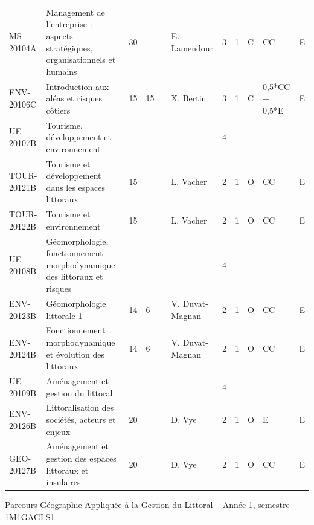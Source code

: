 \documentclass[a4paper,11pt]{article}
\begin{document}
{{\begin{tabular}{lllllllllll}
MS-20104A     & Management de l'entreprise : aspects stratégiques, organisationnels et humains & 30 &    &    & E. Lamendour    & 3    & 1    & C           & CC             & E           \\
ENV-20106C    & Introduction aux aléas et risques côtiers                                      & 15 & 15 &    & X. Bertin       & 3    & 1    & C           & 0,5*CC + 0,5*E & E           \\
\rowcolor[HTML]{C0C0C0} 
UE-20107B     & Tourisme, développement et environnement                                       &    &    &    &                 & 4    &      &             &                &             \\
TOUR-20121B   & Tourisme et développement dans les espaces littoraux                           & 15 &    &    & L. Vacher       & 2    & 1    & O           & CC             & E           \\
TOUR-20122B   & Tourisme et environnement                                                      & 15 &    &    & L. Vacher       & 2    & 1    & O           & CC             & E           \\
\rowcolor[HTML]{C0C0C0} 
UE-20108B     & Géomorphologie, fonctionnement morphodynamique des littoraux et risques        &    &    &    &                 & 4    &      &             &                &             \\
ENV-20123B    & Géomorphologie littorale 1                                                     & 14 & 6  &    & V. Duvat-Magnan & 2    & 1    & O           & CC             & E           \\
ENV-20124B    & Fonctionnement morphodynamique et évolution des littoraux                      & 14 & 6  &    & V. Duvat-Magnan & 2    & 1    & O           & CC             & E           \\
\rowcolor[HTML]{C0C0C0} 
UE-20109B     & Aménagement et gestion du littoral                                             &    &    &    &                 & 4    &      &             &                &             \\
ENV-20126B    & Littoralisation des sociétés, acteurs et enjeux                                & 20 &    &    & D. Vye          & 2    & 1    & O           & E              & E           \\
GEO-20127B    & Aménagement et gestion des espaces littoraux et insulaires                     & 20 &    &    & D. Vye          & 2    & 1    & O           & CC             & E           
\end{tabular}}
}{Parcours Géographie Appliquée à la Gestion du Littoral -- Année 1, semestre 1}{M1GAGLS1}
\end{document}
